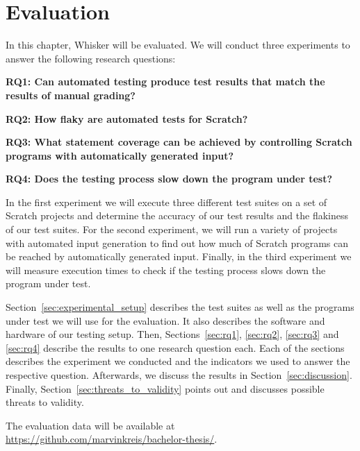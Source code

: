 \chapter{Evaluation}%
\label{cha:evaluation}

In this chapter, Whisker will be evaluated.
We will conduct three experiments to answer the following research questions:

{
    \parspace

    \centering
    \begin{minipage}{.9\textwidth}
        \textbf{RQ1: Can automated testing produce test results that match the results of manual grading?}
        \parspace

        \textbf{RQ2: How flaky are automated tests for Scratch?}
        \parspace

        \textbf{RQ3: What statement coverage can be achieved by controlling Scratch programs with automatically generated input?}
        \parspace

        \textbf{RQ4: Does the testing process slow down the program under test?}
    \end{minipage}

    \parspace
}


\noindent In the first experiment we will execute three different test suites on a set of Scratch projects
and determine the accuracy of our test results and the flakiness of our test suites.
For the second experiment, we will run a variety of projects with automated input generation
to find out how much of Scratch programs can be reached by automatically generated input.
Finally, in the third experiment we will measure execution times
to check if the testing process slows down the program under test.
\parspace

Section~\ref{sec:experimental_setup} describes the test suites as well as the programs under test we will use for the evaluation.
It also describes the software and hardware of our testing setup.
Then, Sections~\ref{sec:rq1}, \ref{sec:rq2}, \ref{sec:rq3} and \ref{sec:rq4} describe the results to one research question each.
Each of the sections describes the experiment we conducted and the indicators we used
to answer the respective question.
Afterwards, we discuss the results in Section~\ref{sec:discussion}.
Finally, Section~\ref{sec:threats_to_validity} points out and discusses possible threats to validity.%
\parspace

The evaluation data will be available at \url{https://github.com/marvinkreis/bachelor-thesis/}.

